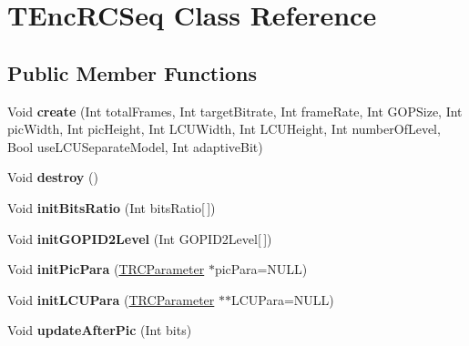 \hypertarget{class_t_enc_r_c_seq}{}\section{T\+Enc\+R\+C\+Seq Class Reference}
\label{class_t_enc_r_c_seq}
\subsection*{Public Member Functions}
\begin{DoxyCompactItemize}
\item 
\mbox{\label{class_t_enc_r_c_seq_aa043defd86415e6918678d27812f3ef9}} 
Void {\bfseries create} (Int total\+Frames, Int target\+Bitrate, Int frame\+Rate, Int G\+O\+P\+Size, Int pic\+Width, Int pic\+Height, Int L\+C\+U\+Width, Int L\+C\+U\+Height, Int number\+Of\+Level, Bool use\+L\+C\+U\+Separate\+Model, Int adaptive\+Bit)
\item 
\mbox{\label{class_t_enc_r_c_seq_ab44785071a2edb60c6d4a9a92068f218}} 
Void {\bfseries destroy} ()
\item 
\mbox{\label{class_t_enc_r_c_seq_a45927f169b64101add3ce82290110a9f}} 
Void {\bfseries init\+Bits\+Ratio} (Int bits\+Ratio\mbox{[}$\,$\mbox{]})
\item 
\mbox{\label{class_t_enc_r_c_seq_abbc52040287e9e72c77c6fe154fc428b}} 
Void {\bfseries init\+G\+O\+P\+I\+D2\+Level} (Int G\+O\+P\+I\+D2\+Level\mbox{[}$\,$\mbox{]})
\item 
\mbox{\label{class_t_enc_r_c_seq_a07c775960d5fb6383e101b0caef2477f}} 
Void {\bfseries init\+Pic\+Para} (\hyperlink{struct_t_r_c_parameter}{T\+R\+C\+Parameter} $\ast$pic\+Para=N\+U\+LL)
\item 
\mbox{\label{class_t_enc_r_c_seq_a4cd03ac5ed02f1d377d0fa8032d907ae}} 
Void {\bfseries init\+L\+C\+U\+Para} (\hyperlink{struct_t_r_c_parameter}{T\+R\+C\+Parameter} $\ast$$\ast$L\+C\+U\+Para=N\+U\+LL)
\item 
\mbox{\label{class_t_enc_r_c_seq_a2e7dd86ed914f57ac5ad3d883b35a5d0}} 
Void {\bfseries update\+After\+Pic} (Int bits)
$$
\end{DoxyCompactItemize}
